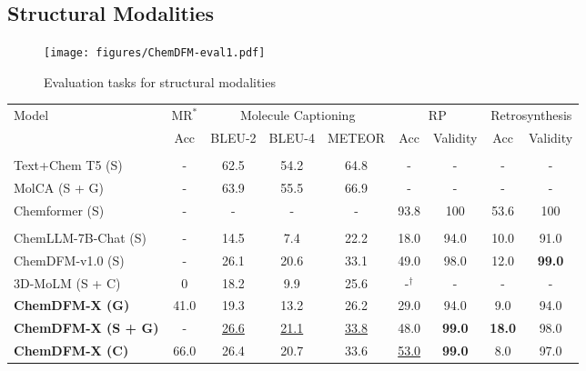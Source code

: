 \subsection{Structural Modalities}

\begin{figure}
    \centering
    \texttt{[image: figures/ChemDFM-eval1.pdf]}
    \caption{Evaluation tasks for structural modalities}
    \label{figure:eval1}
\end{figure}

\begin{table*}
    \centering
    \setlength\tabcolsep{5pt}
    \begin{tabular}{lcccccccc}
    \toprule
    \multirow{2.1}{*}{Model} & $\text{MR}^*$ & \multicolumn{3}{c}{Molecule Captioning} & \multicolumn{2}{c}{RP} & \multicolumn{2}{c}{Retrosynthesis} \\
    \cmidrule(rl){2-2} \cmidrule(rl){3-5} \cmidrule(rl){6-7} \cmidrule(rl){8-9}
    & \small{Acc} & \small{BLEU-2} & \small{BLEU-4} & \small{METEOR} & \small{Acc} & \small{Validity} & \small{Acc} & \small{Validity} \\
    \midrule
    \rowcolor{grey}\multicolumn{9}{c}{\textit{specialist models}} \\
    Text+Chem T5 (S)~\cite{christofidellis2023unifying} & - & 62.5 & 54.2 & 64.8 & - & - & - & - \\
    MolCA (S + G)~\cite{liu2023molca} & - & 63.9 & 55.5 & 66.9 & - & - & - & - \\
    Chemformer (S)~\cite{chemformer} & - & - & - & - & 93.8 & 100 & 53.6 & 100 \\
    \midrule
    \rowcolor{grey}\multicolumn{9}{c}{\textit{generalist models}} \\
    ChemLLM-7B-Chat (S)~\cite{zhang2024chemllm} & - & 14.5 & 7.4 & 22.2 & 18.0 & 94.0 & 10.0 & 91.0 \\
    ChemDFM-v1.0 (S)~\cite{zhao2024chemdfm} & - & 26.1 & 20.6 & 33.1 & 49.0 & 98.0 & 12.0 & \textbf{99.0} \\
    3D-MoLM (S + C)~\cite{li2024molm} & 0 & 18.2 & 9.9 & 25.6 & $\text{-}^\dag$ & - & - & -  \\
    \multirow{1}{*}{\textbf{ChemDFM-X (G)}} & 41.0 & 19.3 & 13.2 & 26.2 & 29.0 & 94.0 & 9.0 & 94.0 \\
    \multirow{1}{*}{\textbf{ChemDFM-X (S + G)}} & - & \underline{26.6} & \underline{21.1} & \underline{33.8} & 48.0 & \textbf{99.0} & \textbf{18.0} & 98.0 \\
    \multirow{1}{*}{\textbf{ChemDFM-X (C)}} & 66.0 & 26.4 & 20.7 & 33.6 & \underline{53.0} & \textbf{99.0} & 8.0 & 97.0 \\

\end{tabular}
\end{table*}
